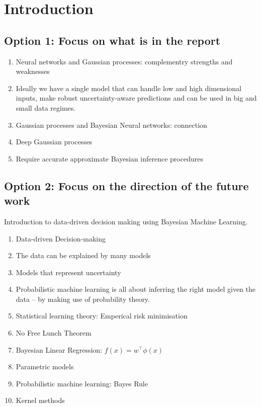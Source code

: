 \chapter{Introduction}  %


\section{Option 1: Focus on what is in the report}

\begin{enumerate}
    \item Neural networks and Gaussian processes: complementry strengths and weaknesses
    \item Ideally we have a single model that can handle low and high dimensional inputs, make robust uncertainty-aware predictions and can be used in big and small data regimes.
    \item Gaussian processes and Bayesian Neural networks: connection \citep{neal1992bayesian,neal1996bayesian,williams1996gaussian}
    \item Deep Gaussian processes \citep{Damianou2013}
    \item Require accurate approximate Bayesian inference procedures
\end{enumerate}


\section{Option 2: Focus on the direction of the future work}
Introduction to data-driven decision making using Bayesian Machine Learning.

\begin{enumerate}
    \item Data-driven Decision-making
    \item The data can be explained by many models
    \item Models that represent uncertainty
    \item Probabilistic machine learning is all about inferring the right model given the data -- by making use of probability theory.
    \item Statistical learning theory: Emperical risk minimisation
    \item No Free Lunch Theorem
    \item Bayesian Linear Regression: $f(x) = w^\top \phi(x)$
    \item Parametric models
    \item Probabilistic machine learning: Bayes Rule
    \item Kernel methods
\end{enumerate}


